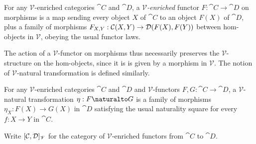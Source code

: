 \begin{definition}
\label{def:cmon-enriched:enriched-functor}
For any $\mathscr{V}$-enriched categories $\cat{C}$ and $\cat{D}$, a \emph{$\mathscr{V}$-enriched} functor $F:
\cat{C} \to \cat{D}$ on morphisms is a map sending every object $X$ of $\cat{C}$ to an object $F(X)$ of
$\cat{D}$, plus a family of morphisms $F_{X,Y}: {\mathcal{C}}(X,Y) \to {\mathcal{D}}(F(X),F(Y))$ between
hom-objects in $\mathscr{V}$, obeying the usual functor laws.
\end{definition}

\noindent The action of a $\mathscr{V}$-functor on morphisms thus necessarily preserves the
$\mathscr{V}$-structure on the hom-objects, since it is is given by a morphism in $\mathscr{V}$. The notion of
$\mathscr{V}$-natural transformation is defined similarly.

\begin{definition}
For any $\mathscr{V}$-enriched categories $\cat{C}$ and $\cat{D}$ and $\mathscr{V}$-functors $F, G: \cat{C}
\to \cat{D}$, a {$\mathscr{V}$-natural transformation} $\eta: F \naturalto G$ is a family of morphisms
$\eta_X: F(X) \to G(X)$ in $\cat{D}$ satisfying the usual naturality square for every $f: X \to Y$ in
$\cat{C}$. 
\end{definition}

%
%

\begin{definition}
Write $[\mathcal{C},\mathcal{D}]_{\mathscr{V}}$ for the category of $\mathscr{V}$-enriched functors from
$\cat{C}$ to $\cat{D}$.
\end{definition}
